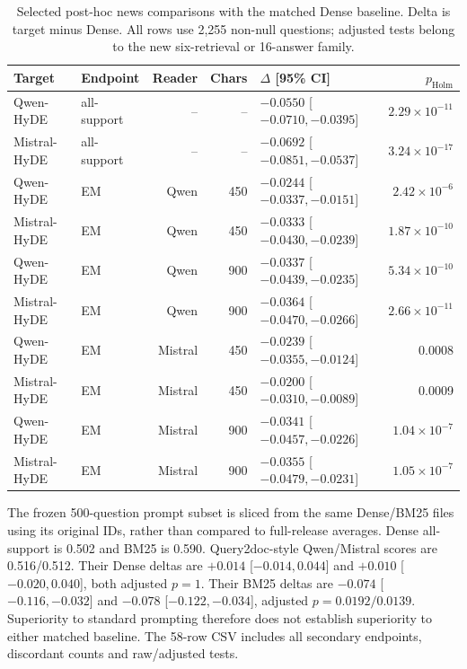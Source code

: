 \begin{table}[htbp]
\centering\footnotesize
\caption{Selected post-hoc news comparisons with the matched Dense baseline. Delta is target minus Dense. All rows use 2,255 non-null questions; adjusted tests belong to the new six-retrieval or 16-answer family.}
\label{tab:priority_dense_pairs}
\begin{tabularx}{\textwidth}{X l r r l r}
\toprule
Target & Endpoint & Reader & Chars & $\Delta$ [95\% CI] & $p_{\mathrm{Holm}}$ \\
\midrule
Qwen-HyDE & all-support & -- & -- & $-0.0550$ [$-0.0710,-0.0395$] & $2.29\times10^{-11}$ \\
Mistral-HyDE & all-support & -- & -- & $-0.0692$ [$-0.0851,-0.0537$] & $3.24\times10^{-17}$ \\
Qwen-HyDE & EM & Qwen & 450 & $-0.0244$ [$-0.0337,-0.0151$] & $2.42\times10^{-6}$ \\
Mistral-HyDE & EM & Qwen & 450 & $-0.0333$ [$-0.0430,-0.0239$] & $1.87\times10^{-10}$ \\
Qwen-HyDE & EM & Qwen & 900 & $-0.0337$ [$-0.0439,-0.0235$] & $5.34\times10^{-10}$ \\
Mistral-HyDE & EM & Qwen & 900 & $-0.0364$ [$-0.0470,-0.0266$] & $2.66\times10^{-11}$ \\
Qwen-HyDE & EM & Mistral & 450 & $-0.0239$ [$-0.0355,-0.0124$] & 0.0008 \\
Mistral-HyDE & EM & Mistral & 450 & $-0.0200$ [$-0.0310,-0.0089$] & 0.0009 \\
Qwen-HyDE & EM & Mistral & 900 & $-0.0341$ [$-0.0457,-0.0226$] & $1.04\times10^{-7}$ \\
Mistral-HyDE & EM & Mistral & 900 & $-0.0355$ [$-0.0479,-0.0231$] & $1.05\times10^{-7}$ \\
\bottomrule
\end{tabularx}
\end{table}

The frozen 500-question prompt subset is sliced from the same Dense/BM25 files using its original IDs, rather than compared to full-release averages. Dense all-support is 0.502 and BM25 is 0.590. Query2doc-style Qwen/Mistral scores are 0.516/0.512. Their Dense deltas are $+0.014$ [$-0.014,0.044$] and $+0.010$ [$-0.020,0.040$], both adjusted $p=1$. Their BM25 deltas are $-0.074$ [$-0.116,-0.032$] and $-0.078$ [$-0.122,-0.034$], adjusted $p=0.0192/0.0139$. Superiority to standard prompting therefore does not establish superiority to either matched baseline. The 58-row CSV includes all secondary endpoints, discordant counts and raw/adjusted tests.

